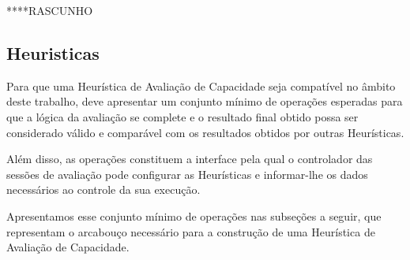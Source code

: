 ****RASCUNHO
\subsection{Heuristicas}
Para que uma Heurística de Avaliação de Capacidade seja compatível no âmbito deste trabalho, 
deve apresentar um conjunto mínimo de operações esperadas para que a lógica da
avaliação se complete e o resultado final obtido possa ser considerado válido e
comparável com os resultados obtidos por outras Heurísticas.

Além disso, as operações constituem a interface pela qual o controlador das 
sessões de avaliação pode configurar as Heurísticas e informar-lhe os dados 
necessários ao controle da sua execução.
 
Apresentamos esse conjunto mínimo de operações nas subseções a seguir, que 
representam o arcabouço necessário para a construção de uma Heurística de 
Avaliação de Capacidade.
 

